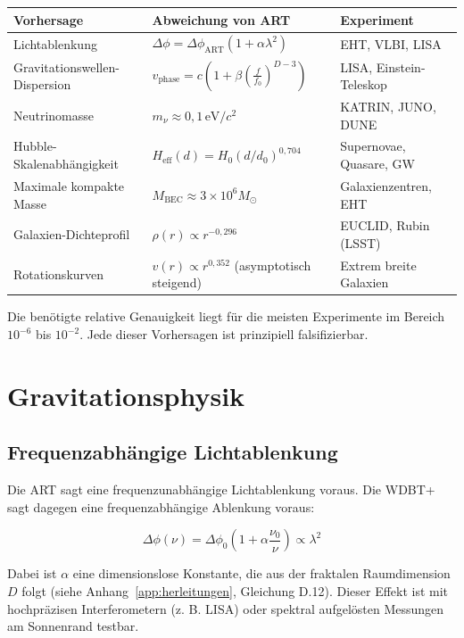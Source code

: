 \begin{tabular}{|l|l|l|}
\hline
\textbf{Vorhersage} & \textbf{Abweichung von ART} & \textbf{Experiment} \\
\hline
Lichtablenkung & \(\Delta\phi = \Delta\phi_{\text{ART}}(1 + \alpha\lambda^2)\) & EHT, VLBI, LISA \\
Gravitationswellen-Dispersion & \(v_{\text{phase}} = c \left(1 + \beta \left(\frac{f}{f_0}\right)^{D-3}\right)\) & LISA, Einstein-Teleskop \\
Neutrinomasse & \(m_\nu \approx 0,1\,\text{eV}/c^2\) & KATRIN, JUNO, DUNE \\
Hubble-Skalenabhängigkeit & \(H_{\text{eff}}(d) = H_0 (d/d_0)^{0,704}\) & Supernovae, Quasare, GW \\
Maximale kompakte Masse & \(M_{\text{BEC}} \approx 3 \times 10^6 M_\odot\) & Galaxienzentren, EHT \\
Galaxien-Dichteprofil & \(\rho(r) \propto r^{-0,296}\) & EUCLID, Rubin (LSST) \\
Rotationskurven & \(v(r) \propto r^{0,352}\) (asymptotisch steigend) & Extrem breite Galaxien \\
\hline
\end{tabular}

Die benötigte relative Genauigkeit liegt für die meisten Experimente im Bereich \( 10^{-6} \) bis \( 10^{-2} \). Jede dieser Vorhersagen ist prinzipiell falsifizierbar.

\section{Gravitationsphysik}
\label{sec:vorh_gravitation}

\subsection{Frequenzabhängige Lichtablenkung}
\label{sub:vorh_lichtablenkung}

Die ART sagt eine frequenzunabhängige Lichtablenkung voraus. Die WDBT+ sagt dagegen eine frequenzabhängige Ablenkung voraus:

\[
\Delta\phi(\nu) = \Delta\phi_0 \left(1 + \alpha \frac{\nu_0}{\nu}\right) \propto \lambda^2
\]

Dabei ist \( \alpha \) eine dimensionslose Konstante, die aus der fraktalen Raumdimension \( D \) folgt (siehe Anhang~\ref{app:herleitungen}, Gleichung D.12). Dieser Effekt ist mit hochpräzisen Interferometern (z. B. LISA) oder spektral aufgelösten Messungen am Sonnenrand testbar.

